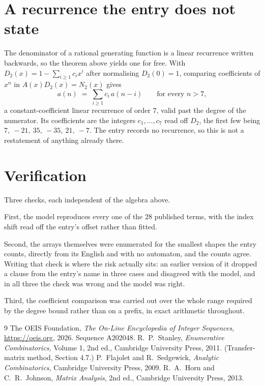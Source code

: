 \documentclass[11pt,a4paper]{article}
\theoremstyle{plain}
\theoremstyle{definition}
\begin{document}
\section{A recurrence the entry does not state}

The denominator of a rational generating function is a linear recurrence written backwards, so
the theorem above yields one for free. With $D_2(x)=1-\sum_{i\ge1}c_ix^i$ after normalising
$D_2(0)=1$, comparing coefficients of $x^n$ in $A(x)D_2(x)=N_2(x)$ gives
\[
a(n)\;=\;\sum_{i\ge1}c_i\,a(n-i)\qquad\text{for every }n>7,
\]
a constant-coefficient linear recurrence of order $7$, valid past the degree of the
numerator. Its coefficients are the integers $c_1,\dots,c_{7}$ read off $D_2$, the first few being $7,\ -21,\ 35,\ -35,\ 21,\ -7$. The entry records no recurrence, so this is not a restatement of anything
already there.

\section{Verification}

Three checks, each independent of the algebra above.

First, the model reproduces every one of the $28$ published terms, with the index shift
read off the entry's offset rather than fitted.

Second, the arrays themselves were enumerated for the smallest shapes the entry counts,
directly from its English and with no automaton, and the counts agree. Writing that check is
where the risk actually sits: an earlier version of it dropped a clause from the entry's name
in three cases and disagreed with the model, and in all three the check was wrong and the model
was right.

Third, the coefficient comparison was carried out over the whole range required by the degree
bound rather than on a prefix, in exact arithmetic throughout.

\begin{thebibliography}{9}
 The OEIS Foundation, \emph{The On-Line Encyclopedia of Integer
Sequences}, \url{https://oeis.org}, 2026. Sequence A202048.
 R.~P.~Stanley, \emph{Enumerative Combinatorics}, Volume 1, 2nd ed.,
Cambridge University Press, 2011. (Transfer-matrix method, Section 4.7.)
 P.~Flajolet and R.~Sedgewick, \emph{Analytic Combinatorics}, Cambridge
University Press, 2009.
 R.~A.~Horn and C.~R.~Johnson, \emph{Matrix Analysis}, 2nd ed., Cambridge
University Press, 2013.
\end{thebibliography}
\end{document}
